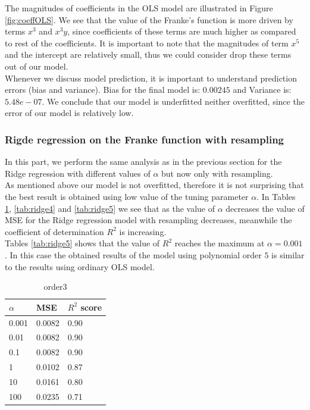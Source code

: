 \documentclass [11pt]{article}
\begin{document}
The magnitudes of coefficients in the OLS model are illustrated in Figure \ref{fig:coeffOLS}. We see that the value of the Franke's function is more driven by terms $x^{3}$ and $x^{3}y$, since coefficients of these terms are much higher as compared to rest of the coefficients. It is important to note that the magnitudes of term $x^{5}$ and the intercept are relatively small, thus we could consider drop these terms out of our model.\\
Whenever we discuss model prediction, it is important to understand prediction errors (bias and variance). Bias for the final model is: $0.00245$ and Variance is: $5.48e-07$. We conclude that our model is underfitted neither overfitted, since the error of our model is relatively low.


\subsubsection{Rigde regression on the Franke function  with resampling}
In this part, we perform the same analysis as in the previous section for the Ridge regression with different values of $\alpha$ but now only with resampling.\\
As mentioned above our model is not overfitted, therefore it is not surprising that the best result is obtained using low value of the tuning parameter $\alpha$. In Tables \ref{tab:ridge3}, \ref{tab:ridge4} and \ref{tab:ridge5} we see that as the value of $\alpha$ decreases the value of MSE for the Ridge regression model with resampling decreases, meanwhile the coefficient of determination $R^{2}$ is increasing.\\
Tables \ref{tab:ridge5} shows that the value of $R^{2}$ reaches the maximum at $\alpha=0.001$. In this case the obtained results of the model using polynomial order $5$ is similar to the results using ordinary OLS model.
\begin{table}[H]
\centering
\begin{tabular}{lll}
\hline
$\alpha$ & MSE    & $R^{2}$ score \\ \hline
0.001     & 0.0082 & 0.90          \\
0.01      & 0.0082 & 0.90          \\
0.1       & 0.0082 & 0.90          \\
1         & 0.0102 & 0.87          \\
10        & 0.0161 & 0.80          \\
100       & 0.0235 & 0.71          \\ \hline
\end{tabular}
\caption{order3}
\label{tab:ridge3}
\end{table}
\end{document}
